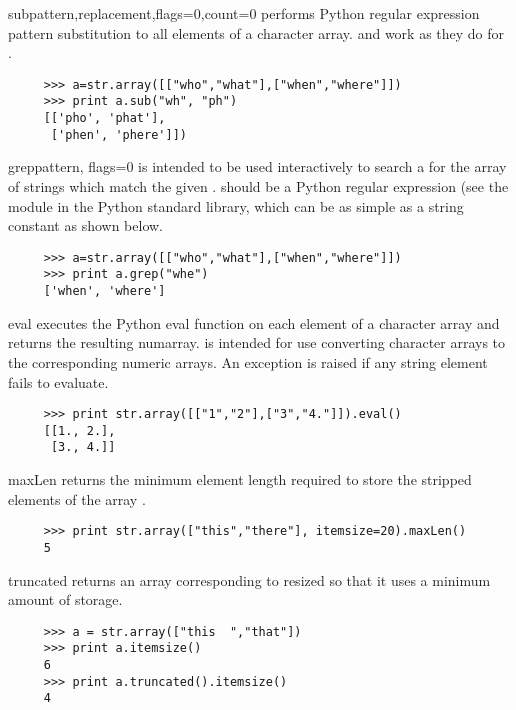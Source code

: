 \begin{methoddesc}[RawCharArray]{sub}{pattern,replacement,flags=0,count=0}
   performs Python regular expression pattern substitution
  to all elements of a character array.  and  work
  as they do for .
\begin{verbatim}
     >>> a=str.array([["who","what"],["when","where"]])
     >>> print a.sub("wh", "ph")
     [['pho', 'phat'],
      ['phen', 'phere']])
\end{verbatim}
\end{methoddesc}
\begin{methoddesc}[RawCharArray]{grep}{pattern, flags=0}
   is intended to be used interactively to search a 
  for the array of strings which match the given .
   should be a Python regular expression (see the 
  module in the Python standard library, which can be as simple as a string
  constant as shown below.
\begin{verbatim}
     >>> a=str.array([["who","what"],["when","where"]])
     >>> print a.grep("whe")
     ['when', 'where']
\end{verbatim}
\end{methoddesc}
\begin{methoddesc}[RawCharArray]{eval}{}
   executes the Python eval function on each element of a character
  array and returns the resulting numarray.   is intended for use
  converting character arrays to the corresponding numeric arrays.  An
  exception is raised if any string element fails to evaluate.
\begin{verbatim}
     >>> print str.array([["1","2"],["3","4."]]).eval()
     [[1., 2.],
      [3., 4.]]
\end{verbatim}
\end{methoddesc}
\begin{methoddesc}[RawCharArray]{maxLen}{}
   returns the minimum element length required to store the
  stripped elements of the array .
\begin{verbatim}
     >>> print str.array(["this","there"], itemsize=20).maxLen()
     5
\end{verbatim}
\end{methoddesc}
\begin{methoddesc}[RawCharArray]{truncated}{}
   returns an array corresponding to  resized
  so that it uses a minimum amount of storage.
\begin{verbatim}
     >>> a = str.array(["this  ","that"])
     >>> print a.itemsize()
     6
     >>> print a.truncated().itemsize()
     4
\end{verbatim}
\end{methoddesc}
